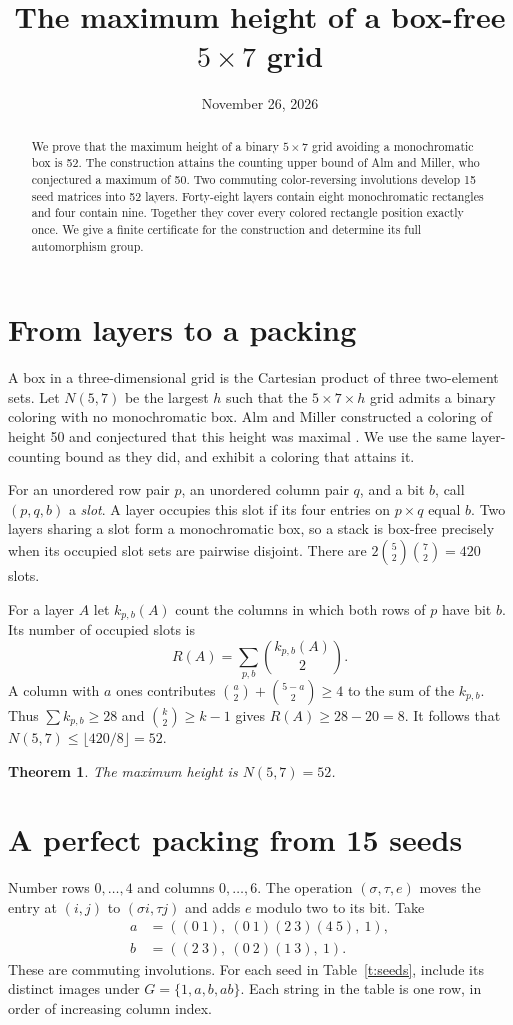 \documentclass[11pt]{article}
\title{The maximum height of a box-free $5\times7$ grid}
\author{}\date{November 26, 2026}
\newtheorem{theorem}{Theorem}
\begin{document}
\maketitle
\begin{abstract}
We prove that the maximum height of a binary $5\times7$ grid avoiding a monochromatic box is 52. The construction attains the counting upper bound of Alm and Miller, who conjectured a maximum of 50. Two commuting color-reversing involutions develop 15 seed matrices into 52 layers. Forty-eight layers contain eight monochromatic rectangles and four contain nine. Together they cover every colored rectangle position exactly once. We give a finite certificate for the construction and determine its full automorphism group.
\end{abstract}

\section{From layers to a packing}
A box in a three-dimensional grid is the Cartesian product of three two-element sets. Let $N(5,7)$ be the largest $h$ such that the $5\times7\times h$ grid admits a binary coloring with no monochromatic box. Alm and Miller constructed a coloring of height 50 and conjectured that this height was maximal \cite[\S6]{alm}. We use the same layer-counting bound as they did, and exhibit a coloring that attains it.

For an unordered row pair $p$, an unordered column pair $q$, and a bit $b$, call $(p,q,b)$ a \emph{slot}. A layer occupies this slot if its four entries on $p\times q$ equal $b$. Two layers sharing a slot form a monochromatic box, so a stack is box-free precisely when its occupied slot sets are pairwise disjoint. There are $2\binom52\binom72=420$ slots.

For a layer $A$ let $k_{p,b}(A)$ count the columns in which both rows of $p$ have bit $b$. Its number of occupied slots is
\[
 R(A)=\sum_{p,b}\binom{k_{p,b}(A)}2.
\]
A column with $a$ ones contributes $\binom a2+\binom{5-a}2\ge4$ to the sum of the $k_{p,b}$. Thus $\sum k_{p,b}\ge28$ and $\binom k2\ge k-1$ gives $R(A)\ge28-20=8$. It follows that $N(5,7)\le\lfloor420/8\rfloor=52$.

\begin{theorem}\label{t:main}
The maximum height is $N(5,7)=52$.
\end{theorem}

\section{A perfect packing from 15 seeds}
Number rows $0,\ldots,4$ and columns $0,\ldots,6$. The operation $(\sigma,\tau,e)$ moves the entry at $(i,j)$ to $(\sigma i,\tau j)$ and adds $e$ modulo two to its bit. Take
\begin{align*}
 a&=((0\ 1),\ (0\ 1)(2\ 3)(4\ 5),\ 1),\\
 b&=((2\ 3),\ (0\ 2)(1\ 3),\ 1).
\end{align*}
These are commuting involutions. For each seed in Table~\ref{t:seeds}, include its distinct images under $G=\{1,a,b,ab\}$. Each string in the table is one row, in order of increasing column index.
\end{document}

